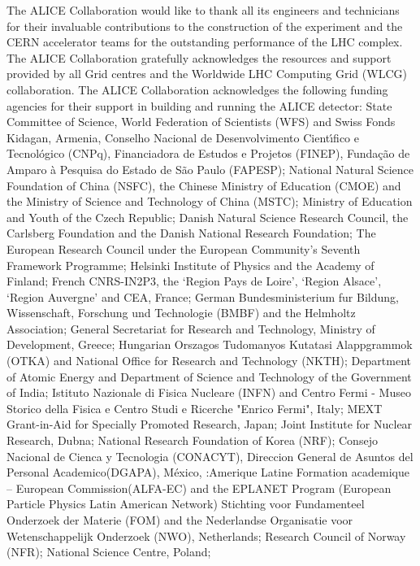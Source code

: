 The ALICE Collaboration would like to thank all its engineers and technicians for their invaluable contributions to the construction of the experiment and the CERN accelerator teams for the outstanding performance of the LHC complex.
%
The ALICE Collaboration gratefully acknowledges the resources and support provided by all Grid centres and the Worldwide LHC Computing Grid (WLCG) collaboration.
%
The ALICE Collaboration acknowledges the following funding agencies for their support in building and
running the ALICE detector:
%
State Committee of Science,  World Federation of Scientists (WFS)
and Swiss Fonds Kidagan, Armenia,
%
Conselho Nacional de Desenvolvimento Cient\'{\i}fico e Tecnol\'{o}gico (CNPq), Financiadora de Estudos e Projetos (FINEP),
Funda\c{c}\~{a}o de Amparo \`{a} Pesquisa do Estado de S\~{a}o Paulo (FAPESP);
%
National Natural Science Foundation of China (NSFC), the Chinese Ministry of Education (CMOE)
and the Ministry of Science and Technology of China (MSTC);
%
Ministry of Education and Youth of the Czech Republic;
%
Danish Natural Science Research Council, the Carlsberg Foundation and the Danish National Research Foundation;
%
The European Research Council under the European Community's Seventh Framework Programme;
%
Helsinki Institute of Physics and the Academy of Finland;
%
French CNRS-IN2P3, the `Region Pays de Loire', `Region Alsace', `Region Auvergne' and CEA, France;
%
German Bundesministerium fur Bildung, Wissenschaft, Forschung und Technologie (BMBF) and the Helmholtz Association;
%
General Secretariat for Research and Technology, Ministry of
Development, Greece;
%
Hungarian Orszagos Tudomanyos Kutatasi Alappgrammok (OTKA) and National Office for Research and Technology (NKTH);
%
Department of Atomic Energy and Department of Science and Technology of the Government of India;
%
Istituto Nazionale di Fisica Nucleare (INFN) and Centro Fermi -
Museo Storico della Fisica e Centro Studi e Ricerche "Enrico
Fermi", Italy;
%
MEXT Grant-in-Aid for Specially Promoted Research, Ja\-pan;
%
Joint Institute for Nuclear Research, Dubna;
%
National Research Foundation of Korea (NRF);
%
Consejo Nacional de Cienca y Tecnologia (CONACYT), Direccion General de Asuntos del Personal Academico(DGAPA), M\'{e}xico, :Amerique Latine Formation academique – European Commission(ALFA-EC) and the EPLANET Program
(European Particle Physics Latin American Network)
%
Stichting voor Fundamenteel Onderzoek der Materie (FOM) and the Nederlandse Organisatie voor Wetenschappelijk Onderzoek (NWO), Netherlands;
%
Research Council of Norway (NFR);
%
National Science Centre, Poland;

